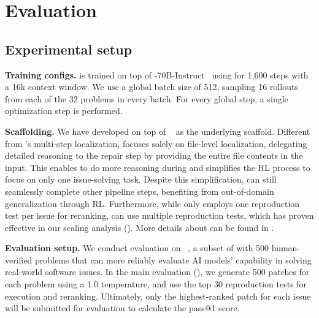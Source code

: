 \section{Evaluation}
\label{section:evaluation}

\subsection{Experimental setup}
\label{subsec:setup}

\textbf{Training configs.}
\ours[70] is trained on top of -70B-Instruct~\cite{llama31} using \tech for 1,600 steps with a 16k context window.
We use a global batch size of 512, sampling 16 rollouts from each of the 32 problems in every batch.
For every global step, a single optimization step is performed.

\textbf{Scaffolding.}
We have developed \ouragentless on top of \agentless~\cite{agentless} as the underlying scaffold.
Different from \agentless's multi-step localization, \ouragentless focuses solely on file-level localization, delegating detailed reasoning to the repair step by providing the entire file contents in the input.
This enables \ours to do more reasoning during \tech and simplifies the RL process to focus on only one issue-solving task.
Despite this simplification, \ours can still seamlessly complete other pipeline steps, benefiting from out-of-domain generalization through RL.
Furthermore, while \agentless only employs one reproduction test per issue for reranking, \ouragentless can use multiple reproduction tests, which has proven effective in our scaling analysis ().
More details about \ouragentless can be found in .

\textbf{Evaluation setup.}
We conduct evaluation on \swebverified~\cite{swebverified}, a subset of \swebench with 500 human-verified problems that can more reliably evaluate AI models' capability in solving real-world software issues.
In the main evaluation (), we generate 500 patches for each problem using a 1.0 temperature, and use the top 30 reproduction tests for execution and reranking.
Ultimately, only the highest-ranked patch for each issue will be submitted for \swebench evaluation to calculate the pass@1 score.

